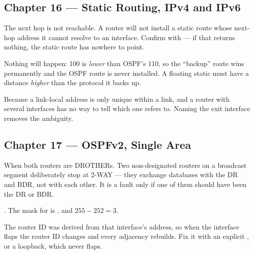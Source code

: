 \subsection*{Chapter 16 --- Static Routing, IPv4 and IPv6}
\begin{tightnum}
  \item The next hop is not reachable. A router will not install a static route
        whose next-hop address it cannot resolve to an interface. Confirm with
         --- if that returns nothing, the static
        route has nowhere to point.
  \item Nothing will happen: 100 is \emph{lower} than OSPF's 110, so the ``backup''
        route wins permanently and the OSPF route is never installed. A floating
        static must have a distance \emph{higher} than the protocol it backs up.
  \item Because a link-local address is only unique within a link, and a router
        with several interfaces has no way to tell which one  refers
        to. Naming the exit interface removes the ambiguity.
\end{tightnum}

\subsection*{Chapter 17 --- OSPFv2, Single Area}
\begin{tightnum}
  \item When both routers are DROTHERs. Two non-designated routers on a broadcast
        segment deliberately stop at 2-WAY --- they exchange databases with the DR
        and BDR, not with each other. It is a fault only if one of them should
        have been the DR or BDR.
  \item {}. The mask for  is , and
        $255-252 = 3$.
  \item The router ID was derived from that interface's address, so when the
        interface flaps the router ID changes and every adjacency rebuilds. Fix
        it with an explicit , or a loopback, which never flaps.
\end{tightnum}

